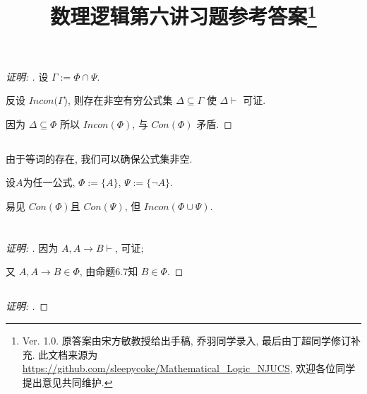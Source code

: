 \documentclass{article}
\begin{document}
\begin{CJK*}{UTF8}{gbsn}
\title{数理逻辑第六讲习题参考答案\footnote{Ver. 1.0. 原答案由宋方敏教授给出手稿, 乔羽同学录入, 最后由丁超同学修订补充. 此文档来源为\mbox{\url{https://github.com/sleepycoke/Mathematical_Logic_NJUCS}},
 欢迎各位同学提出意见共同维护. 
}}
\maketitle
\section{}

\subsection{}
\begin{proof}[\emph{证明: }]	
设 $\Gamma := \Phi \cap \Psi $.  

反设 $Incon(\Gamma$), 则存在非空有穷公式集 $\Delta \subseteq \Gamma$ 使 $\Delta \vdash$ 可证.  

因为 $\Delta \subseteq \Phi $ 所以 $Incon(\Phi)$, 与 $Con (\Phi)$ 矛盾. 
\end{proof}


\subsection{}
由于等词的存在, 我们可以确保公式集非空. 

设$A$为任一公式,
$\Phi := \{ A\}$, $\Psi := \{  \neg A \}$. 

易见 $Con ({\Phi})$且 $Con ({\Psi})$, 但 $Incon (\Phi \cup \Psi)$.

\section{}
\subsection{}
\begin{proof}[\emph{证明: }]
因为 $A , A \rightarrow B \vdash$, 可证; 

又 $A,A\rightarrow B \in \Phi$, 
由命题6.7知 $B \in \Phi$. 
\end{proof}

\subsection{}
\begin{proof}[\emph{证明: }]


\end{proof}
\end{CJK*}
\end{document}
